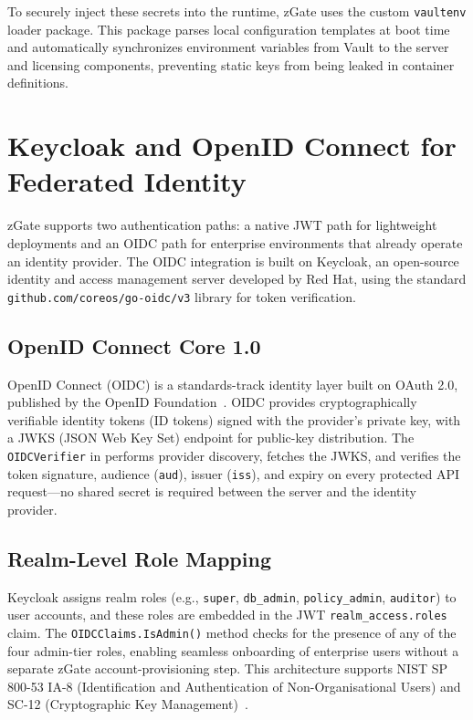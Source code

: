 To securely inject these secrets into the runtime, zGate uses the custom \texttt{vaultenv} loader package. This package parses local configuration templates at boot time and automatically synchronizes environment variables from Vault to the server and licensing components, preventing static keys from being leaked in container definitions.

\section{Keycloak and OpenID Connect for Federated Identity}
\label{sec:keycloak}

zGate supports two authentication paths: a native JWT path for lightweight deployments and an OIDC path for enterprise environments that already operate an identity provider. The OIDC integration is built on Keycloak, an open-source identity and access management server developed by Red Hat, using the standard \texttt{github.com/coreos/go-oidc/v3} library for token verification.

\subsection{OpenID Connect Core 1.0}

OpenID Connect (OIDC) is a standards-track identity layer built on OAuth 2.0, published by the OpenID Foundation~\cite{oidc-core}. OIDC provides cryptographically verifiable identity tokens (ID tokens) signed with the provider's private key, with a JWKS (JSON Web Key Set) endpoint for public-key distribution. The \texttt{OIDCVerifier} in  performs provider discovery, fetches the JWKS, and verifies the token signature, audience (\texttt{aud}), issuer (\texttt{iss}), and expiry on every protected API request---no shared secret is required between the server and the identity provider.

\subsection{Realm-Level Role Mapping}

Keycloak assigns realm roles (e.g., \texttt{super}, \texttt{db\_admin}, \texttt{policy\_admin}, \texttt{auditor}) to user accounts, and these roles are embedded in the JWT \texttt{realm\_access.roles} claim. The \texttt{OIDCClaims.IsAdmin()} method checks for the presence of any of the four admin-tier roles, enabling seamless onboarding of enterprise users without a separate zGate account-provisioning step. This architecture supports NIST SP 800-53 IA-8 (Identification and Authentication of Non-Organisational Users) and SC-12 (Cryptographic Key Management)~\cite{nist-controls}.

